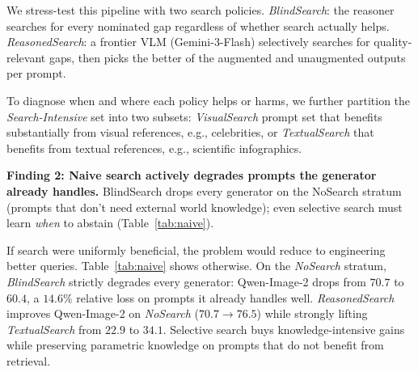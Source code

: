 \documentclass{article}
\begin{document}
We stress-test this pipeline with two search policies.
\emph{BlindSearch}: the reasoner searches for every nominated gap regardless of whether search actually helps.
\emph{ReasonedSearch}: a frontier VLM (Gemini-3-Flash) selectively searches for quality-relevant gaps, then picks the better of the augmented and unaugmented outputs per prompt.

To diagnose when and where each policy helps or harms, we further partition the \emph{Search-Intensive} set into two subsets: \emph{VisualSearch} prompt set that benefits substantially from visual references, e.g., celebrities, or \emph{TextualSearch} that benefits from textual references, e.g., scientific infographics.



\begin{finding}
\textbf{Finding 2: Naive search actively degrades prompts the generator already handles.}
BlindSearch drops every generator on the NoSearch stratum (prompts that don't need external world knowledge); even selective search must learn \emph{when} to abstain (Table~\ref{tab:naive}).
\end{finding}

If search were uniformly beneficial, the problem would reduce to engineering better queries.
Table~\ref{tab:naive} shows otherwise.
On the \emph{NoSearch} stratum, \emph{BlindSearch} strictly degrades every generator: Qwen-Image-2 drops from $70.7$ to $60.4$, a $14.6\%$ relative loss on prompts it already handles well.
\emph{ReasonedSearch} improves Qwen-Image-2 on \emph{NoSearch} ($70.7 \to 76.5$) while strongly lifting \emph{TextualSearch} from $22.9$ to $34.1$.
Selective search buys knowledge-intensive gains while preserving parametric knowledge on prompts that do not benefit from retrieval.

\end{document}
